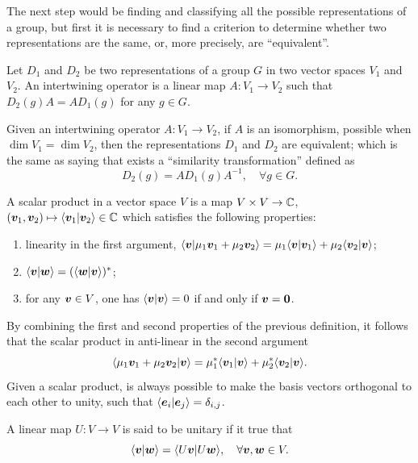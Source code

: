 The next step would be finding and classifying all the possible representations of a group, but first it is necessary to find a criterion to determine whether two representations are the same, or, more precisely, are ``equivalent''. 
\begin{defn}
    Let $D_1$ and $D_2$ be two representations of a group $G$ in two vector spaces $V_1$ and $V_2$. An intertwining operator is a linear map $A : V_1 \to V_2$ such that $D_2(g)A = AD_1(g)$ for any $g \in G$.
\end{defn}
\begin{teo}
    Given an intertwining operator $A : V_1 \to V_2$, if $A$ is an isomorphism, possible when $\dim{V_1} = \dim{V_2}$, then the representations $D_1$ and $D_2$ are equivalent; which is the same as saying that exists a ``similarity transformation'' defined as
    \begin{equation}
        D_2(g) = AD_1(g)A^{-1},\quad \forall g \in G.
    \end{equation}
\end{teo}
\begin{defn}
    A scalar product in a vector space $V$ is a map $V \times V \to \mathbb{C}$, $(\bm{v}_1,\bm{v}_2) \mapsto \langle \bm{v}_1 | \bm{v}_2 \rangle \in \mathbb{C}$ which satisfies the following properties:
    \begin{enumerate}
        \item linearity in the first argument, $\langle \bm{v} | \mu_1\bm{v}_1 + \mu_2\bm{v}_2 \rangle = \mu_1\langle \bm{v} | \bm{v}_1 \rangle + \mu_2\langle \bm{v}_2 | \bm{v} \rangle$;
        \item $\langle \bm{v} | \bm{w} \rangle = (\langle \bm{w} | \bm{v} \rangle)^*$;
        \item for any $\bm{v} \in V$, one has $\langle \bm{v} | \bm{v} \rangle = 0$ if and only if $\bm{v} = \bm{0}$.
    \end{enumerate}
\end{defn}
By combining the first and second properties of the previous definition, it follows that the scalar product in anti-linear in the second argument
\begin{equation}
    \langle \mu_1\bm{v}_1 + \mu_2\bm{v}_2 | \bm{v} \rangle = \mu_1^*\langle \bm{v}_1 | \bm{v} \rangle + \mu_2^*\langle \bm{v}_2 | \bm{v} \rangle.
\end{equation}
Given a scalar product, is always possible to make the basis vectors orthogonal to each other to unity, such that $\langle \bm{e}_i | \bm{e}_j \rangle = \delta_{i,j}$.
\begin{defn}
    A linear map $U : V \to V$ is said to be unitary if it true that
    \begin{equation}
        \langle \bm{v} | \bm{w} \rangle = \langle U\bm{v} | U\bm{w} \rangle,\quad \forall \bm{v},\bm{w} \in V.
    \end{equation}
\end{defn}
